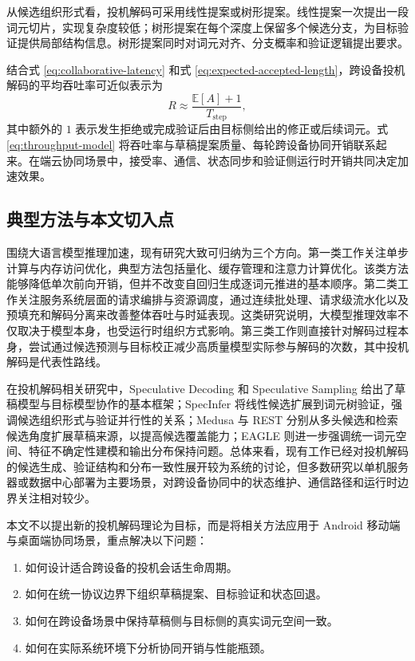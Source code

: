 从候选组织形式看，投机解码可采用线性提案或树形提案。线性提案一次提出一段词元切片，实现复杂度较低；树形提案在每个深度上保留多个候选分支，为目标验证提供局部结构信息\cite{miao2023specinfer,li2024eagle}。树形提案同时对词元对齐、分支概率和验证逻辑提出要求。

结合式 \eqref{eq:collaborative-latency} 和式 \eqref{eq:expected-accepted-length}，跨设备投机解码的平均吞吐率可近似表示为
\begin{equation}
  R
  \approx
  \frac{\mathbb{E}[A] + 1}{T_{\mathrm{step}}},
  \label{eq:throughput-model}
\end{equation}
其中额外的 $1$ 表示发生拒绝或完成验证后由目标侧给出的修正或后续词元。式 \eqref{eq:throughput-model} 将吞吐率与草稿提案质量、每轮跨设备协同开销联系起来。在端云协同场景中，接受率、通信、状态同步和验证侧运行时开销共同决定加速效果。

\subsection{典型方法与本文切入点}

围绕大语言模型推理加速，现有研究大致可归纳为三个方向。第一类工作关注单步计算与内存访问优化，典型方法包括量化、缓存管理和注意力计算优化\cite{frantar2022gptq,kwon2023pagedattention,dao2022flashattention,song2023powerinfer}。该类方法能够降低单次前向开销，但并不改变自回归生成逐词元推进的基本顺序。第二类工作关注服务系统层面的请求编排与资源调度，通过连续批处理、请求级流水化以及预填充和解码分离来改善整体吞吐与时延表现\cite{yu2022orca,wu2023fastserve,zhong2024distserve}。这类研究说明，大模型推理效率不仅取决于模型本身，也受运行时组织方式影响。第三类工作则直接针对解码过程本身，尝试通过候选预测与目标校正减少高质量模型实际参与解码的次数，其中投机解码是代表性路线\cite{leviathan2023speculative,chen2023speculative,miao2023specinfer,li2024eagle}。

在投机解码相关研究中，Speculative Decoding 和 Speculative Sampling 给出了草稿模型与目标模型协作的基本框架\cite{leviathan2023speculative,chen2023speculative}；SpecInfer 将线性候选扩展到词元树验证，强调候选组织形式与验证并行性的关系\cite{miao2023specinfer}；Medusa 与 REST 分别从多头候选和检索候选角度扩展草稿来源，以提高候选覆盖能力\cite{cai2024medusa,he2023rest}；EAGLE 则进一步强调统一词元空间、特征不确定性建模和输出分布保持问题\cite{li2024eagle}。总体来看，现有工作已经对投机解码的候选生成、验证结构和分布一致性展开较为系统的讨论，但多数研究以单机服务器或数据中心部署为主要场景，对跨设备协同中的状态维护、通信路径和运行时边界关注相对较少。

本文不以提出新的投机解码理论为目标，而是将相关方法应用于 Android 移动端与桌面端协同场景，重点解决以下问题：

\begin{enumerate}[label=\arabic*.]
  \item 如何设计适合跨设备的投机会话生命周期。
  \item 如何在统一协议边界下组织草稿提案、目标验证和状态回退。
  \item 如何在跨设备场景中保持草稿侧与目标侧的真实词元空间一致。
  \item 如何在实际系统环境下分析协同开销与性能瓶颈。
\end{enumerate}
